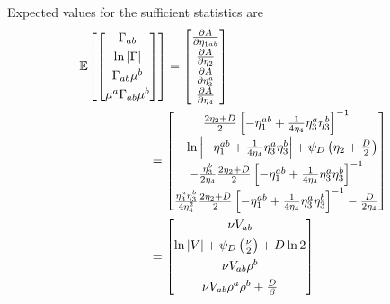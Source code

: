 \documentclass[aps,showpacs,twocolumn,prd,superscriptaddress,nofootinbib]{revtex4}
\newcommand{\nn}{\nonumber}
\newcommand{\E}[1]{{\mathbb E}_{#1}\!}
\begin{document}
Expected values for the sufficient statistics are
\begin{align*}
\E{}\left[ 
\begin{bmatrix}
  \Gamma_{ab}\\[.7ex]
  \ln\left|\Gamma\right|\\[.7ex]
  \Gamma_{ab}\mu^b\\[.7ex]
  \mu^a\Gamma_{ab}\mu^b
\end{bmatrix}
\right]
&=
\begin{bmatrix}
  \frac{\partial A}{\partial\eta_{1ab}}\\[.7ex]
  \frac{\partial A}{\partial\eta_{2}}  \\[.7ex]
  \frac{\partial A}{\partial\eta_{3}^a}\\[.7ex]
  \frac{\partial A}{\partial\eta_{4}}  
\end{bmatrix}\nn\\
&\mkern-25mu=
\begin{bmatrix}
      \frac{2\eta_2+D}2\left[-\eta_1^{ab}+\frac1{4\eta_4}\eta_3^a\eta_3^b\right]^{-1}\\[1ex]
      -\ln\left|-\eta_1^{ab}+\frac1{4\eta_4}\eta_3^a\eta_3^b\right|+\psi_D\left(\eta_2+\frac{D}2\right)\\[1ex]
      -\frac{\eta_3^b}{2\eta_4}\frac{2\eta_2+D}2\left[-\eta_1^{ab}+\frac1{4\eta_4}\eta_3^a\eta_3^b\right]^{-1}\\[1ex]
        \frac{\eta_3^a\eta_3^b}{4\eta_4^2}\frac{2\eta_2+D}2\left[-\eta_1^{ab}+\frac1{4\eta_4}\eta_3^a\eta_3^b\right]^{-1}-\frac D{2\eta_4}
\end{bmatrix}\\
&\mkern-25mu=
\begin{bmatrix}
      {\nu}V_{ab}\\[1ex]
      \ln\left|V\right|+\psi_D\left(\frac\nu2\right)+D\ln2\\[1ex]
      \nu V_{ab}\rho^b\\[1ex]
      \nu V_{ab}\rho^a\rho^b+\frac D\beta
\end{bmatrix}
\end{align*}
\end{document}
